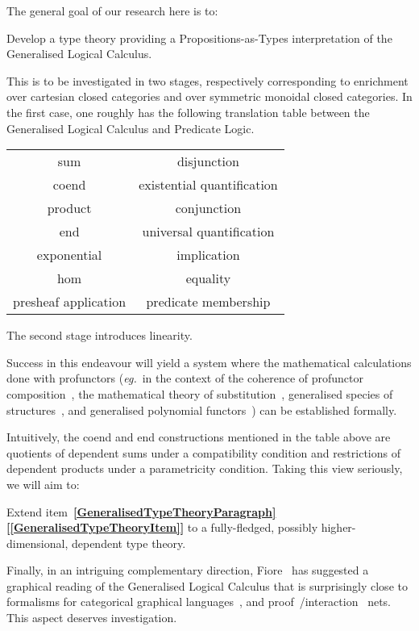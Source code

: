 \documentclass[11pt,twocolumn]{article}
\newcounter{CC}
\newenvironment{resenumerate}
  {\begin{list}{[\textbf{\arabic{CC}]}}
  {\usecounter{CC}
   \setlength{\topsep}{2pt}
   \setlength{\partopsep}{2pt}
   \setlength{\itemsep}{2.5pt}
   \setlength{\parsep}{2.5pt}
   \setlength{\leftmargin}{1.65em}
   \setlength{\labelwidth}{1.15em}
 }}
  {\end{list}}
\newcommand{\itemref}[1]{\textbf{[\ref{#1}]}}
\newcommand{\eg}{\emph{eg.}}
\begin{document}
The general goal of our research here is to:
\begin{resenumerate}\setcounter{CC}{0}
\item\label{GeneralisedTypeTheoryItem}
   Develop a type theory providing a Propositions-as-Types interpretation
   of the Generalised Logical Calculus.
\end{resenumerate}
This is to be investigated in two stages, respectively corresponding to
enrichment over cartesian closed categories and over symmetric monoidal
closed categories.  In the first case, one roughly has the following
translation table between the Generalised Logical Calculus and Predicate
Logic.
\begin{center}\begin{tabular}{|c|c|}\hline
  sum & disjunction\\ 
  coend & existential quantification\\ 
  product & conjunction\\ 
  end & universal quantification\\ 
  exponential & implication\\ 
  hom & equality\\ 
  presheaf application & predicate membership\\
  \hline
\end{tabular}\end{center}
The second stage introduces linearity. 

Success in this endeavour will yield a system where the mathematical
calculations done with profunctors (\eg~in the context of the coherence of
profunctor composition~\cite{Benabou}, the mathematical theory of
substitution~\cite{FioreFossacs}, generalised species of
structures~\cite{Species}, and generalised polynomial
functors~\cite{FioreICALP}) can be established formally.

Intuitively, the coend and end constructions mentioned in the table above are
quotients of dependent sums under a compatibility condition and restrictions
of dependent products under a parametricity condition.  Taking this view
seriously, we will aim to:
\begin{resenumerate}\setcounter{CC}{1}
\item
  Extend
  item~\textbf{\ref{GeneralisedTypeTheoryParagraph}}\thinspace\itemref{GeneralisedTypeTheoryItem}
  to a fully-fledged, possibly higher-dimensional, dependent type theory.  
\end{resenumerate}

Finally, in an intriguing complementary direction,
Fiore~\cite{FioreFossacs} has suggested a graphical reading of the
Generalised Logical Calculus that is surprisingly close to formalisms for
categorical graphical languages~\cite{Selinger}, and
proof~\cite{GirardLinearLogic}/interaction~\cite{Lafont} nets.  This
aspect deserves investigation.
\end{document}
